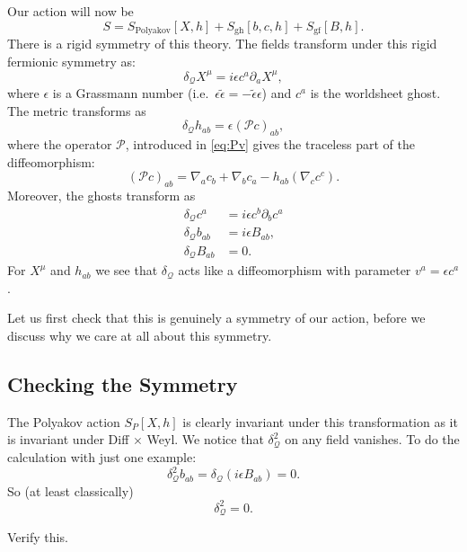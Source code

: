 
Our action will now be
\begin{equation}
  S = S_{\text{Polyakov}}[X, h] + S_{\text{gh}} [b, c, h] + S_{\text{gf}}[B, h].
\end{equation}
There is a rigid symmetry of this theory.
The fields transform under this rigid fermionic symmetry as:
\begin{equation}
  \delta_{\mathcal{Q}} X^{\mu} = i \epsilon c^{a} \partial_{a} X^{\mu},
\end{equation}
where $\epsilon$ is a Grassmann number (i.e.~$\epsilon \widetilde{\epsilon} = - \widetilde{\epsilon} \epsilon$) and $c^{a}$ is the worldsheet ghost.
The metric transforms as
\begin{equation}
  \delta_{\mathcal{Q}} h_{ab} = \epsilon (\mathcal{P} c)_{ab},
\end{equation}
where the operator $\mathcal{P}$, introduced in \eqref{eq:Pv} gives the traceless part of the diffeomorphism:
\begin{equation}
  (\mathcal{P}c)_{ab} = \nabla_a c_b + \nabla_b c_a - h_{ab} (\nabla_c c^{c}).
\end{equation}
Moreover, the ghosts transform as
\begin{align}
  \delta_{\mathcal{Q}} c^{a} &= i \epsilon c^{b} \partial_b c^{a} \\
  \delta_{\mathcal{Q}} b_{ab} &= i \epsilon B_{ab}, \\
  \delta_{\mathcal{Q}} B_{ab} &= 0.
\end{align}
For $X^{\mu}$ and $h_{ab}$ we see that $\delta_{\mathcal{Q}}$ acts like a diffeomorphism with parameter $v^{a} = \epsilon c^{a}$.

Let us first check that this is genuinely a symmetry of our action, before we discuss why we care at all about this symmetry.

\subsection*{Checking the Symmetry}%

The Polyakov action $S_P[X, h]$ is clearly invariant under this transformation as it is invariant under Diff $\times$ Weyl.
We notice that $\delta^2_{\mathcal{Q}}$ on any field vanishes.
To do the calculation with just one example:
\begin{equation}
  \delta^2_{\mathcal{Q}} b_{ab} = \delta_{\mathcal{Q}} (i \epsilon B_{ab}) = 0.
\end{equation}
So (at least classically)
\begin{equation}
  \delta^2_{\mathcal{Q}} = 0.
\end{equation}
\begin{exercise}
  Verify this.
\end{exercise}

